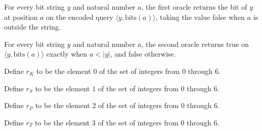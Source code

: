 \begin{lemma}
\label{Complexity.LogProg.TQBFARM.orc_bit}
\leanok
{}
For every bit string $y$ and natural number $a$, the first oracle returns the bit of $y$
at position $a$ on the encoded query $\langle y,\mathrm{bits}(a)\rangle$, taking the
value false when $a$ is outside the string.
\end{lemma}

\begin{lemma}
\label{Complexity.LogProg.TQBFARM.orc_len}
\leanok
{}
For every bit string $y$ and natural number $a$, the second oracle returns true on
$\langle y,\mathrm{bits}(a)\rangle$ exactly when $a<|y|$, and false otherwise.
\end{lemma}

\begin{definition}
\label{Complexity.LogProg.TQBFARM.rK}
\leanok
Define $r_K$ to be the element $0$ of the set of integers from $0$ through $6$.
\end{definition}

\begin{definition}
\label{Complexity.LogProg.TQBFARM.rS}
\leanok
Define $r_S$ to be the element $1$ of the set of integers from $0$ through $6$.
\end{definition}

\begin{definition}
\label{Complexity.LogProg.TQBFARM.rP}
\leanok
Define $r_P$ to be the element $2$ of the set of integers from $0$ through $6$.
\end{definition}

\begin{definition}
\label{Complexity.LogProg.TQBFARM.rT}
\leanok
Define $r_T$ to be the element $3$ of the set of integers from $0$ through $6$.
\end{definition}

